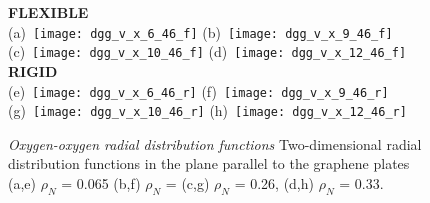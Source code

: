 \documentclass[12pt]{article}
\begin{document}
\begin{figure}[h!]
	\centering
	\textbf{FLEXIBLE} \\
	(a)~\texttt{[image: dgg\_v\_x\_6\_46\_f]} 
	(b)~\texttt{[image: dgg\_v\_x\_9\_46\_f]}
	(c)~\texttt{[image: dgg\_v\_x\_10\_46\_f]}
	(d)~\texttt{[image: dgg\_v\_x\_12\_46\_f]}
	\textbf{RIGID} \\
	(e)~\texttt{[image: dgg\_v\_x\_6\_46\_r]} 
	(f)~\texttt{[image: dgg\_v\_x\_9\_46\_r]}
	(g)~\texttt{[image: dgg\_v\_x\_10\_46\_r]}
	(h)~\texttt{[image: dgg\_v\_x\_12\_46\_r]}
	\vspace{-10pt}
	\caption{\textit{Oxygen-oxygen radial distribution functions} Two-dimensional radial distribution functions in the plane parallel to the graphene plates (a,e) \(\rho_N\) = 0.065 (b,f) \(\rho_N\) =  (c,g) \(\rho_N\) = 0.26, (d,h) \(\rho_N\) = 0.33.}
	\label{fig:chem_forms}
\end{figure}


\clearpage
\printbibliography
\end{document}
